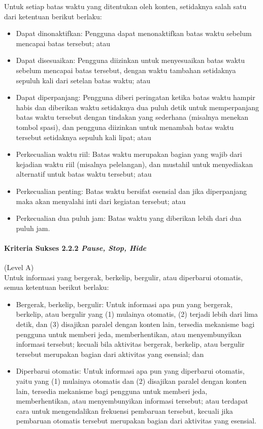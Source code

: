 \documentclass[a4paper,twoside]{article}
\begin{document}
\begin{enumerate}
		Untuk setiap batas waktu yang ditentukan oleh konten, setidaknya salah satu dari ketentuan berikut berlaku:
		\begin{itemize}
			\item Dapat dinonaktifkan: Pengguna dapat menonaktifkan batas waktu sebelum mencapai batas tersebut; atau
			\item Dapat disesuaikan: Pengguna diizinkan untuk menyesuaikan batas waktu sebelum mencapai batas tersebut, dengan waktu tambahan setidaknya sepuluh kali dari setelan batas waktu; atau
			\item Dapat diperpanjang: Pengguna diberi peringatan ketika batas waktu hampir habis dan diberikan waktu setidaknya dua puluh detik untuk memperpanjang batas waktu tersebut dengan tindakan yang sederhana (misalnya menekan tombol spasi), dan pengguna diizinkan untuk menambah batas waktu tersebut setidaknya sepuluh kali lipat; atau
			\item Perkecualian waktu riil: Batas waktu merupakan bagian yang wajib dari kejadian waktu riil (misalnya pelelangan), dan mustahil untuk menyediakan alternatif untuk batas waktu tersebut; atau
			\item Perkecualian penting: Batas waktu bersifat esensial dan jika diperpanjang maka akan menyalahi inti dari kegiatan tersebut; atau
			\item Perkecualian dua puluh jam: Batas waktu yang diberikan lebih dari dua puluh jam.
		\end{itemize}

		\paragraph{Kriteria Sukses 2.2.2 \textit{Pause, Stop, Hide}}
		\label{sec:kriteria_sukses_2.2.2}
		(Level A)\\

		Untuk informasi yang bergerak, berkelip, bergulir, atau diperbarui otomatis, semua ketentuan berikut berlaku:
		\begin{itemize}
			\item Bergerak, berkelip, bergulir: Untuk informasi apa pun yang bergerak, berkelip, atau bergulir yang (1) mulainya otomatis, (2) terjadi lebih dari lima detik, dan (3) disajikan paralel dengan konten lain, tersedia mekanisme bagi pengguna untuk memberi jeda, memberhentikan, atau menyembunyikan informasi tersebut; kecuali bila aktivitas bergerak, berkelip, atau bergulir tersebut merupakan bagian dari aktivitas yang esensial; dan
			\item Diperbarui otomatis: Untuk informasi apa pun yang diperbarui otomatis, yaitu yang (1) mulainya otomatis dan (2) disajikan paralel dengan konten lain, tersedia mekanisme bagi pengguna untuk memberi jeda, memberhentikan, atau menyembunyikan informasi tersebut; atau terdapat cara untuk mengendalikan frekuensi pembaruan tersebut, kecuali jika pembaruan otomatis tersebut merupakan bagian dari aktivitas yang esensial.
		\end{itemize}


\end{enumerate}
\end{document}
